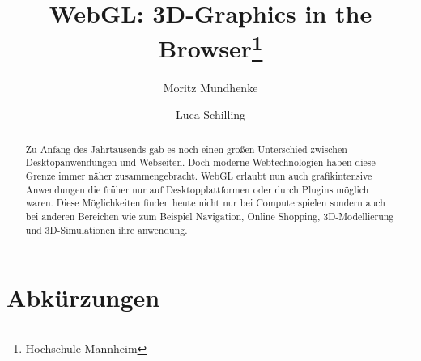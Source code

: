 \documentclass[runningheads]{llncs}
\begin{document}
%
\title{WebGL: 3D-Graphics in the Browser\thanks{Hochschule Mannheim}}
%
%
\author{Moritz Mundhenke \and
Luca Schilling}
%
%
%
\maketitle              %
%


\begin{abstract}
Zu Anfang des Jahrtausends gab es noch einen großen Unterschied zwischen Desktopanwendungen und Webseiten. Doch moderne Webtechnologien haben diese Grenze immer näher zusammengebracht. WebGL erlaubt nun auch grafikintensive Anwendungen die früher nur auf Desktopplattformen oder durch Plugins möglich waren. Diese Möglichkeiten finden heute nicht nur bei Computerspielen sondern auch bei anderen Bereichen wie zum Beispiel Navigation, Online Shopping, 3D-Modellierung und 3D-Simulationen ihre anwendung.
\end{abstract}
%
%
%










\section*{Abkürzungen}
\begin{acronym}[Wasm]
\end{acronym}


{}

\end{document}
